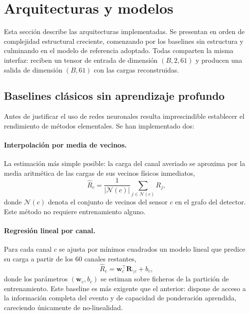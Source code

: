 \section{Arquitecturas y modelos}
\label{sec:arquitecturas}

Esta sección describe las arquitecturas implementadas. Se presentan en orden de complejidad
estructural creciente, comenzando por los baselines sin estructura y culminando en el modelo de
referencia adoptado. Todas comparten la misma interfaz: reciben un tensor de entrada de dimensión
$(B, 2, 61)$ y producen una salida de dimensión $(B, 61)$ con las cargas reconstruidas.

\subsection{Baselines clásicos sin aprendizaje profundo}
\label{subsec:baselines-clasicos}

Antes de justificar el uso de redes neuronales resulta imprescindible establecer el rendimiento de
métodos elementales. Se han implementado dos:

\paragraph{Interpolación por media de vecinos.} La estimación más simple posible: la carga del canal
averiado se aproxima por la media aritmética de las cargas de sus vecinos físicos inmediatos,
\begin{equation}
    \hat{R}_c = \frac{1}{|\mathcal{N}(c)|} \sum_{j \in \mathcal{N}(c)} R_j,
\end{equation}
donde $\mathcal{N}(c)$ denota el conjunto de vecinos del sensor $c$ en el grafo del detector. Este
método no requiere entrenamiento alguno.

\paragraph{Regresión lineal por canal.} Para cada canal $c$ se ajusta por mínimos cuadrados un
modelo lineal que predice su carga a partir de los 60 canales restantes,
\begin{equation}
    \hat{R}_c = \mathbf{w}_c^{\top} \mathbf{R}_{\setminus c} + b_c,
\end{equation}
donde los parámetros $(\mathbf{w}_c, b_c)$ se estiman sobre ficheros de la partición de
entrenamiento. Este baseline es más exigente que el anterior: dispone de acceso a la información
completa del evento y de capacidad de ponderación aprendida, careciendo únicamente de
no-linealidad.

